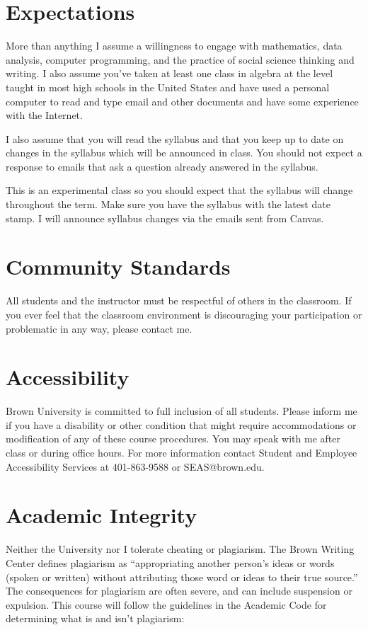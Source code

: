 \section{Expectations}

More than anything I assume a willingness to engage with mathematics, data analysis, computer programming, and the practice of social science thinking and writing. I also assume you've taken at least one class in algebra at the level taught in most high schools in the United States and have used a personal computer to read and type email and other documents and have some experience with the Internet. 

I also assume that you will read the syllabus and that you keep up to date on changes in the syllabus which will be announced in class. You should not expect a response to emails that ask a question already answered in the syllabus. 

This is an experimental class so you should expect that the syllabus will change throughout the term. Make sure you have the syllabus with the latest date stamp. I will announce syllabus changes via the emails sent from Canvas. 

\section{Community Standards}

All students and the instructor must be respectful of others in the classroom. If you ever feel that the classroom environment is discouraging your participation or problematic in any way, please contact me.

\section{Accessibility}
Brown University is committed to full inclusion of all students. Please inform me if you have a disability or other condition that might require accommodations or modification of any of these course procedures. You may speak with me after class or during office hours. For more information contact Student and Employee Accessibility Services at 401-863-9588 or SEAS@brown.edu.

\section{Academic Integrity}

Neither the University nor I tolerate cheating or plagiarism. The Brown Writing Center defines plagiarism as ``appropriating another person's ideas or words (spoken or written) without attributing those word or ideas to their true source.'' The consequences for plagiarism are often severe, and can include suspension or expulsion. This course will follow the guidelines in the Academic Code for determining what is and isn't plagiarism:

